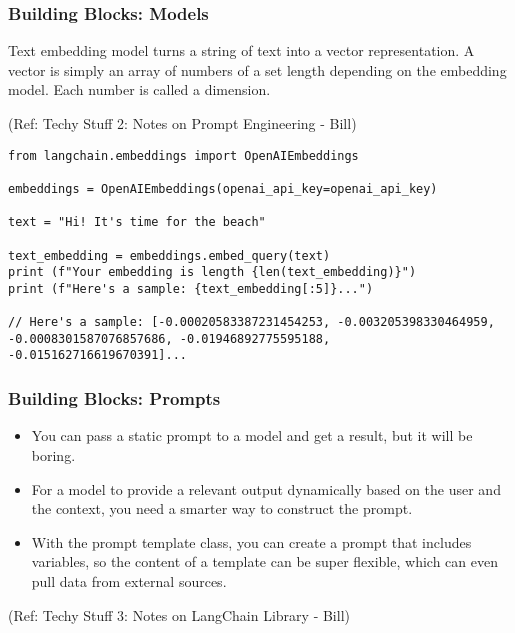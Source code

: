 \begin{frame}[fragile]\frametitle{Building Blocks: Models}

Text embedding model turns a string of text into a vector representation. A vector is simply an array of numbers of a set length depending on the embedding model. Each number is called a dimension.

{\tiny (Ref: Techy Stuff 2: Notes on Prompt Engineering - Bill)}

\begin{lstlisting}
from langchain.embeddings import OpenAIEmbeddings

embeddings = OpenAIEmbeddings(openai_api_key=openai_api_key)

text = "Hi! It's time for the beach"

text_embedding = embeddings.embed_query(text)
print (f"Your embedding is length {len(text_embedding)}")
print (f"Here's a sample: {text_embedding[:5]}...")

// Here's a sample: [-0.00020583387231454253, -0.003205398330464959, -0.0008301587076857686, -0.01946892775595188, -0.015162716619670391]...
\end{lstlisting}	  
\end{frame}


\begin{frame}[fragile]\frametitle{Building Blocks: Prompts}

\begin{itemize}
\item You can pass a static prompt to a model and get a result, but it will be boring. 
\item For a model to provide a relevant output dynamically based on the user and the context, you need a smarter way to construct the prompt.
\item With the prompt template class, you can create a prompt that includes variables, so the content of a template can be super flexible, which can even pull data from external sources.
\end{itemize}

{\tiny (Ref: Techy Stuff 3: Notes on LangChain Library - Bill)}

	  
\end{frame}


